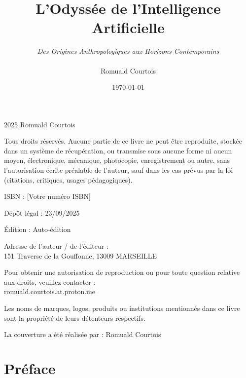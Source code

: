 \documentclass[12pt,a4paper]{book}
\title{L'Odyssée de l'Intelligence Artificielle}
\author{\textit{Des Origines Anthropologiques aux Horizons Contemporains} \\ \\ Romuald Courtois}
\date{\today}
\begin{document}
\maketitle

\newpage

\begin{center}
2025 Romuald Courtois

\bigskip

Tous droits réservés. Aucune partie de ce livre ne peut être reproduite, stockée dans un système de récupération, ou transmise sous aucune forme ni aucun moyen, électronique, mécanique, photocopie, enregistrement ou autre, sans l'autorisation écrite préalable de l'auteur, sauf dans les cas prévus par la loi (citations, critiques, usages pédagogiques).

\bigskip

ISBN : [Votre numéro ISBN]

\bigskip

Dépôt légal : 23/09/2025

\bigskip

Édition : Auto-édition

\bigskip

Adresse de l'auteur / de l'éditeur :\\
151 Traverse de la Gouffonne, 13009 MARSEILLE

\bigskip

Pour obtenir une autorisation de reproduction ou pour toute question relative aux droits, veuillez contacter :\\
romuald.courtois.at.proton.me

\bigskip

Les noms de marques, logos, produits ou institutions mentionnés dans ce livre sont la propriété de leurs détenteurs respectifs.

\bigskip

La couverture a été réalisée par : Romuald Courtois
\end{center}

\newpage

\section{Préface}
\end{document}
